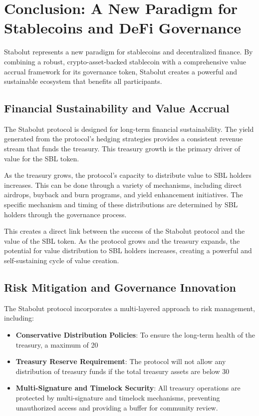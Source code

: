 \section{Conclusion: A New Paradigm for Stablecoins and DeFi Governance}

Stabolut represents a new paradigm for stablecoins and decentralized finance. By combining a robust, crypto-asset-backed stablecoin with a comprehensive value accrual framework for its governance token, Stabolut creates a powerful and sustainable ecosystem that benefits all participants.

\subsection{Financial Sustainability and Value Accrual}
The Stabolut protocol is designed for long-term financial sustainability. The yield generated from the protocol's hedging strategies provides a consistent revenue stream that funds the treasury. This treasury growth is the primary driver of value for the SBL token.

As the treasury grows, the protocol's capacity to distribute value to SBL holders increases. This can be done through a variety of mechanisms, including direct airdrops, buyback and burn programs, and yield enhancement initiatives. The specific mechanism and timing of these distributions are determined by SBL holders through the governance process.

This creates a direct link between the success of the Stabolut protocol and the value of the SBL token. As the protocol grows and the treasury expands, the potential for value distribution to SBL holders increases, creating a powerful and self-sustaining cycle of value creation.

\subsection{Risk Mitigation and Governance Innovation}
The Stabolut protocol incorporates a multi-layered approach to risk management, including:

\begin{itemize}
    \item \textbf{Conservative Distribution Policies}: To ensure the long-term health of the treasury, a maximum of 20%
    \item \textbf{Treasury Reserve Requirement}: The protocol will not allow any distribution of treasury funds if the total treasury assets are below 30%
    \item \textbf{Multi-Signature and Timelock Security}: All treasury operations are protected by multi-signature and timelock mechanisms, preventing unauthorized access and providing a buffer for community review.
\end{itemize}

